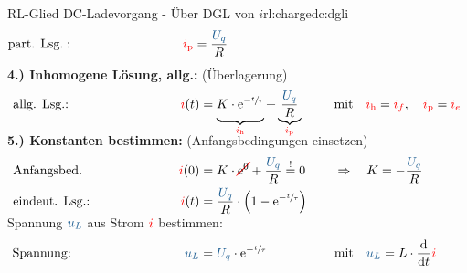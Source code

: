 \begin{frame}[t]
{\begin{bsp}{RL-Glied DC-Ladevorgang - Über DGL von $i$}{rl:chargedc:dgli}
\begin{align*}
        &\text{part. Lsg.}:&&&
            \eci{i_{\mathrm p}} &= \frac{\ecv{U_q}}{R}
        \\[-15pt]&\hphantom{R1oooooooooo}&&&\hphantom{L3ooooooooooo}&\hphantom{R3ooooooooooooooo}&&&&\hphantom{R5oooooooooooooooooo}\nonumber%
    \end{align*}%
    \textbf{4.) Inhomogene Lösung, allg.:} (Überlagerung)%
    \begin{align*}%
        &\text{allg. Lsg.:}&&&
            \eci{i}(t) &=
            \underbrace{%
                K \cdot \mathrm{e}^{-\sfrac{t}{\tau}} \vphantom{\frac{\ecv{U_q}}{R}}%
            }_{\eci{i_{\mathrm h}}}
            +
            \underbrace{
                \frac{\ecv{U_q}}{R}
            }_{\eci{i_{\mathrm p}}} &&&
            &\text{mit}\quad \eci{i_{\mathrm h}}=\eci{i_f},\quad \eci{i_{\mathrm p}}=\eci{i_e}
        \\[-15pt]&\hphantom{R1oooooooooo}&&&\hphantom{L3ooooooooooo}&\hphantom{R3ooooooooooooooo}&&&&\hphantom{R5oooooooooooooooooo}\nonumber%
        \end{align*}%
    \textbf{5.) Konstanten bestimmen:} (Anfangsbedingungen einsetzen)%
    \begin{align*}%
        &\text{Anfangsbed.}&&&
            \eci{i}(0) &= K \cdot \redcancel{\mathrm{e}^0} + \frac{\ecv{U_q}}{R} \overset{!}{=} 0 &&&
            &\Rightarrow\quad K = -\frac{\ecv{U_q}}{R}\\
        &\text{eindeut. Lsg.:}&&&
            \eci{i}(t) &= \frac{\ecv{U_q}}{R} \cdot \left( 1 - \mathrm{e}^{-\sfrac{t}{\tau}} \right)
        \\[-15pt]&\hphantom{R1oooooooooo}&&&\hphantom{L3ooooooooooo}&\hphantom{R3ooooooooooooooo}&&&&\hphantom{R5oooooooooooooooooo}\nonumber%
    \end{align*}%
    Spannung $\ecv{u_L}$ aus Strom ${\color{red}i}$ bestimmen:%
    \begin{align*}%
        &\text{Spannung:}&&&
            \ecv{u_L} &= \ecv{U_q} \cdot \mathrm{e}^{-\sfrac{t}{\tau}} &&&
            &\text{mit}\quad \ecv{u_L} = L \cdot \dt \eci{i}
        \\[-15pt]&\hphantom{R1oooooooooo}&&&\hphantom{L3ooooooooooo}&\hphantom{R3ooooooooooooooo}&&&&\hphantom{R5oooooooooooooooooo}\nonumber%
    \end{align*}
    \endgroup
\end{bsp}
}%


\end{frame}
